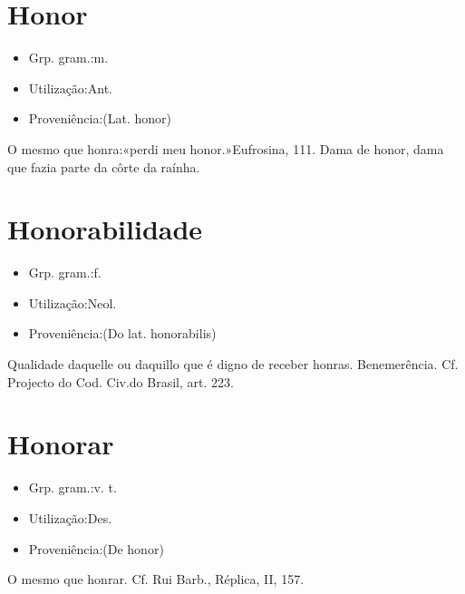 \documentclass{article}
\begin{document}
\section{Honor}
\begin{itemize}
\item {Grp. gram.:m.}
\end{itemize}
\begin{itemize}
\item {Utilização:Ant.}
\end{itemize}
\begin{itemize}
\item {Proveniência:(Lat. \textunderscore honor\textunderscore )}
\end{itemize}
O mesmo que \textunderscore honra\textunderscore :«\textunderscore perdi meu honor.\textunderscore »\textunderscore Eufrosina\textunderscore , 111.
\textunderscore Dama de honor\textunderscore , dama que fazia parte da côrte da raínha.
\section{Honorabilidade}
\begin{itemize}
\item {Grp. gram.:f.}
\end{itemize}
\begin{itemize}
\item {Utilização:Neol.}
\end{itemize}
\begin{itemize}
\item {Proveniência:(Do lat. \textunderscore honorabilis\textunderscore )}
\end{itemize}
Qualidade daquelle ou daquillo que é digno de receber honras.
Benemerência. Cf. \textunderscore Projecto do Cod. Civ.\textunderscore  do Brasil, art. 223.
\section{Honorar}
\begin{itemize}
\item {Grp. gram.:v. t.}
\end{itemize}
\begin{itemize}
\item {Utilização:Des.}
\end{itemize}
\begin{itemize}
\item {Proveniência:(De \textunderscore honor\textunderscore )}
\end{itemize}
O mesmo que \textunderscore honrar\textunderscore . Cf. Rui Barb., \textunderscore Réplica\textunderscore , II, 157.
\end{document}
